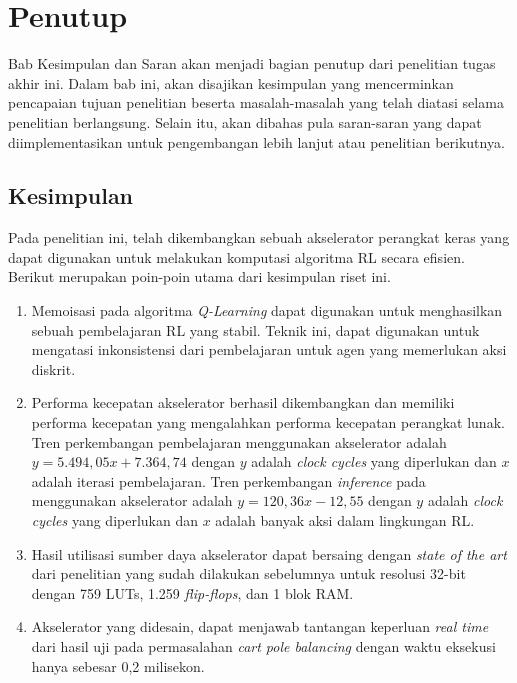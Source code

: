 \chapter{Penutup}

Bab Kesimpulan dan Saran akan menjadi bagian penutup dari penelitian tugas akhir ini. Dalam bab ini, akan disajikan kesimpulan yang mencerminkan pencapaian tujuan penelitian beserta masalah-masalah yang telah diatasi selama penelitian berlangsung. Selain itu, akan dibahas pula saran-saran yang dapat diimplementasikan untuk pengembangan lebih lanjut atau penelitian berikutnya.

\section{Kesimpulan}

Pada penelitian ini, telah dikembangkan sebuah akselerator perangkat keras yang dapat digunakan untuk melakukan komputasi algoritma \ac{RL} secara efisien. Berikut merupakan poin-poin utama dari kesimpulan riset ini.

\begin{enumerate}
	\item Memoisasi pada algoritma \textit{Q-Learning} dapat digunakan untuk menghasilkan sebuah pembelajaran \ac{RL} yang stabil. Teknik ini, dapat digunakan untuk mengatasi inkonsistensi dari pembelajaran untuk agen yang memerlukan aksi diskrit.
	\item Performa kecepatan akselerator berhasil dikembangkan dan memiliki performa kecepatan yang mengalahkan performa kecepatan perangkat lunak. Tren perkembangan pembelajaran menggunakan akselerator adalah $y = 5.494,05x + 7.364,74$ dengan $y$ adalah \textit{clock cycles} yang diperlukan dan $x$ adalah iterasi pembelajaran. Tren perkembangan \textit{inference} pada menggunakan akselerator adalah $y = 120,36x - 12,55$ dengan $y$ adalah \textit{clock cycles} yang diperlukan dan $x$ adalah banyak aksi dalam lingkungan \ac{RL}.
	\item Hasil utilisasi sumber daya akselerator dapat bersaing dengan \textit{state of the art} dari penelitian yang sudah dilakukan sebelumnya untuk resolusi 32-bit dengan 759 \ac{LUTs}, 1.259 \textit{flip-flops}, dan 1 blok \ac{RAM}.
	\item Akselerator yang didesain, dapat menjawab tantangan keperluan \textit{real time} dari hasil uji pada permasalahan \textit{cart pole balancing} dengan waktu eksekusi hanya sebesar 0,2 milisekon.
\end{enumerate}

